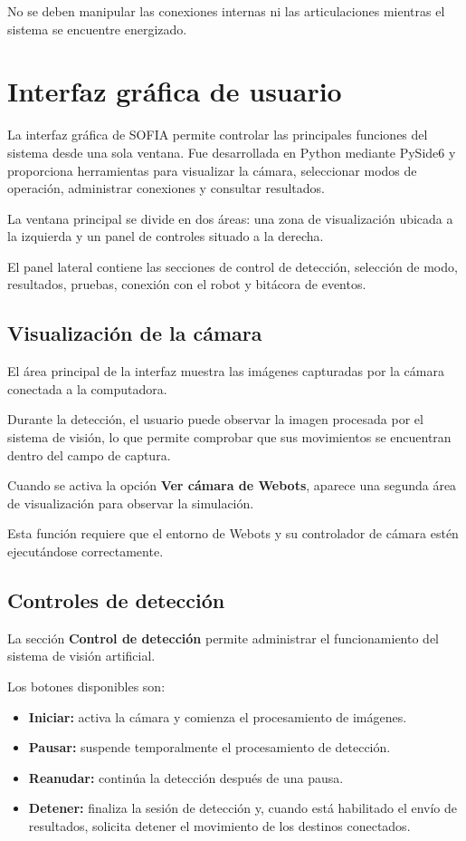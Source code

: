 \documentclass[letterpaper,journal]{IEEEtran}
\begin{document}
No se deben manipular las conexiones
internas ni las articulaciones mientras
el sistema se encuentre energizado.

\section{Interfaz gráfica de usuario}
\label{sec:interfaz}

La interfaz gráfica de SOFIA permite controlar
las principales funciones del sistema desde una
sola ventana. Fue desarrollada en Python mediante
PySide6 y proporciona herramientas para visualizar
la cámara, seleccionar modos de operación,
administrar conexiones y consultar resultados.

La ventana principal se divide en dos áreas:
una zona de visualización ubicada a la izquierda
y un panel de controles situado a la derecha.

El panel lateral contiene las secciones de
control de detección, selección de modo,
resultados, pruebas, conexión con el robot
y bitácora de eventos.

\subsection{Visualización de la cámara}

El área principal de la interfaz muestra las
imágenes capturadas por la cámara conectada
a la computadora.

Durante la detección, el usuario puede observar
la imagen procesada por el sistema de visión,
lo que permite comprobar que sus movimientos
se encuentran dentro del campo de captura.

Cuando se activa la opción
\textbf{Ver cámara de Webots}, aparece una
segunda área de visualización para observar
la simulación.

Esta función requiere que el entorno de
Webots y su controlador de cámara estén
ejecutándose correctamente.

\subsection{Controles de detección}

La sección \textbf{Control de detección}
permite administrar el funcionamiento del
sistema de visión artificial.

Los botones disponibles son:

\begin{itemize}
    \item \textbf{Iniciar:} activa la cámara
    y comienza el procesamiento de imágenes.

    \item \textbf{Pausar:} suspende temporalmente
    el procesamiento de detección.

    \item \textbf{Reanudar:} continúa la
    detección después de una pausa.

    \item \textbf{Detener:} finaliza la sesión
    de detección y, cuando está habilitado
    el envío de resultados, solicita detener
    el movimiento de los destinos conectados.
\end{itemize}
\end{document}
